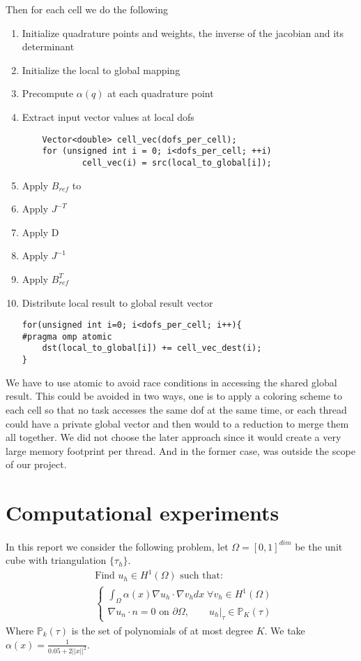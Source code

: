 \documentclass[12pt]{article}
\begin{document}
Then for each cell we do the following
\begin{enumerate}
\item Initialize quadrature points and weights, the inverse of the jacobian and its determinant
\item Initialize the local to global mapping
\item Precompute $\alpha(q)$ at each quadrature point
\item Extract input vector values at local dofs
\begin{lstlisting}
	Vector<double> cell_vec(dofs_per_cell);
	for (unsigned int i = 0; i<dofs_per_cell; ++i)
			cell_vec(i) = src(local_to_global[i]);
\end{lstlisting}
\item Apply $B_{ref}$ to 
\item Apply $J^{-T}$
\item Apply D
\item Apply $J^{-1}$
\item Apply $B^{T}_{ref}$
\item Distribute local result to global result vector
\begin{lstlisting}
for(unsigned int i=0; i<dofs_per_cell; i++){
#pragma omp atomic
	dst(local_to_global[i]) += cell_vec_dest(i);
}
\end{lstlisting}
\end{enumerate}
We have to use atomic to avoid race conditions in accessing the shared global result. This could be avoided in two ways, one is to apply a coloring scheme to each cell so that no task accesses the same dof at the same time, or each thread could have a private global vector and then would to a reduction to merge them all together. We did not choose the later approach since it would create a very large memory footprint per thread. And in the former case, was outside the scope of our project.


\section{Computational experiments}
In this report we consider the following problem, let $\Omega = [0, 1]^{dim}$ be the unit cube with triangulation $\{\tau_{h}\}$.
\begin{align*}
&\text{Find } u_{h} \in H^{1}(\Omega) \text{ such that: }  \\
&\begin{cases}
\int_{\Omega} \alpha(x) \nabla u_{h} \cdot \nabla v_{h} dx \; \forall v_{h} \in H^{1}(\Omega) \\
\nabla u_{n} \cdot n = 0 \text{ on } \partial \Omega ,\qquad u_{h} \vert_{\tau} \in \mathbb{P}_{K}(\tau) 
\end{cases}
\end{align*}
Where $\mathbb{P}_{k}(\tau) $ is the set of polynomials of at most degree $K$. We take $\alpha(x) = \frac{1}{0.05 + 2\vert \vert x \vert \vert^{2}}$.
\end{document}
